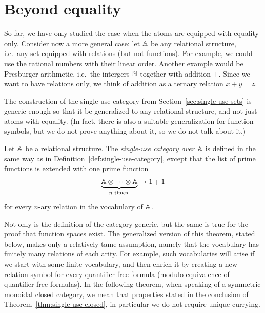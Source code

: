 \section{Beyond equality}
\label{sec:beyond-equality}

So far, we have only studied the case when the atoms are equipped with equality only. Consider now a more general case: let $\mathbb A$ be any relational structure, i.e.~any set equipped with relations (but not functions). For example, we could use the rational numbers with their linear order. Another example would be Presburger arithmetic, i.e.~the intergers ${\mathbb N}$ together with addition $+$. Since we want to have relations only, we think of addition as a ternary relation $x + y =z$. 

The construction of the single-use category from Section~\ref{sec:single-use-sets} is generic enough so that it be generalized to any relational structure, and not just atoms with equality. (In fact, there is also a suitable generalization for function symbols, but we do not prove anything about it, so we do not talk about it.)

\begin{definition}\label{def:single-use-category-relational-structures}
    Let $\mathbb A$ be a relational structure. The \emph{single-use category over $\mathbb A$} is defined in the same way as in Definition~\ref{def:single-use-category}, except that the list of prime functions is extended with one prime function 
    \begin{align*}
        \myunderbrace{\atoms \otimes \cdots \otimes \atoms}{$n$ times} \to 1+1
        \end{align*}
        for every $n$-ary relation in the vocabulary of $\mathbb A$. 
\end{definition}


Not only is the definition of the category generic, but the same is true for  the proof that function spaces exist. The generalized version of this theorem, stated below, makes only a relatively tame assumption, namely that the vocabulary has finitely many relations of each arity. For example, such vocabularies will arise if we start with some finite vocabulary, and then enrich it by creating a new relation symbol for every quantifier-free formula (modulo equivalence of quantifier-free formulas). In the following theorem, when speaking of a symmetric monoidal closed category, we mean that properties stated in the conclusion of Theorem~\ref{thm:single-use-closed}, in particular we do not require unique currying.



